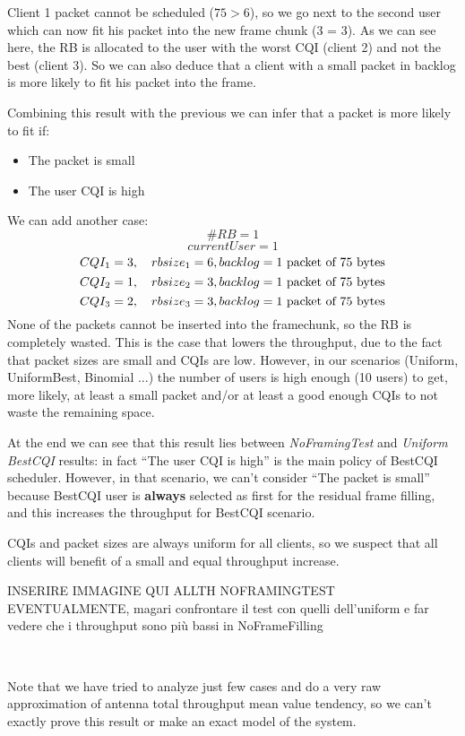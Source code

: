 Client 1 packet cannot be scheduled (\(75 > 6\)), so we go next to the second user which can now fit his packet into the new frame chunk (3 = 3). As we can see here, the RB is allocated to the user with the worst CQI (client 2) and not the best (client 3). So we can also deduce that a client with a small packet in backlog is more likely to fit his packet into the frame.

Combining this result with the previous we can infer that a packet is more likely to fit if:
\begin{itemize}
	\item The packet is small
	\item The user CQI is high
\end{itemize}
We can add another case:
\[\#RB = 1\]
\[currentUser = 1\]
\[CQI_1 = 3, \quad rbsize_1 = 6, backlog = \textnormal{1 packet of 75 bytes}\]
\[CQI_2 = 1, \quad rbsize_2 = 3, backlog = \textnormal{1 packet of 75 bytes}\]
\[CQI_3 = 2, \quad rbsize_3 = 3, backlog = \textnormal{1 packet of 75 bytes}\]
None of the packets cannot be inserted into the framechunk, so the RB is completely wasted. This is the case that lowers the throughput, due to the fact that packet sizes are small and CQIs are low. However, in our scenarios (Uniform, UniformBest, Binomial ...) the number of users is high enough (10 users) to get, more likely, at least a small packet and/or at least a good enough CQIs to not waste the remaining space.

At the end we can see that this result lies between \textit{NoFramingTest} and \textit{Uniform BestCQI} results: in fact ``The user CQI is high'' is the main policy of BestCQI scheduler. However, in that scenario, we can't consider ``The packet is small'' because BestCQI user is \textbf{always} selected as first for the residual frame filling, and this increases the throughput for BestCQI scenario.

CQIs and packet sizes are always uniform for all clients, so we suspect that all clients will benefit of a small and equal throughput increase.
\begin{center}
	INSERIRE IMMAGINE QUI ALLTH NOFRAMINGTEST EVENTUALMENTE, magari confrontare il test con quelli dell'uniform e far vedere che i throughput sono più bassi in NoFrameFilling
\end{center}
\

Note that we have tried to analyze just few cases and do a very raw approximation of antenna total throughput mean value tendency, so we can't exactly prove this result or make an exact model of the system.